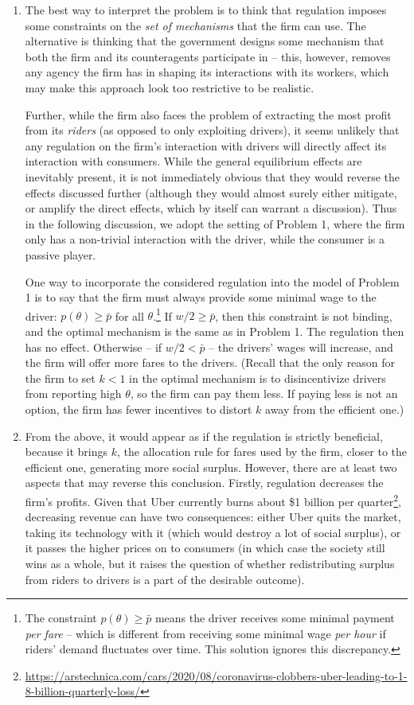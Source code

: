 \documentclass[a4paper]{article}
\begin{document}
	\begin{enumerate}
		\item The best way to interpret the problem is to think that regulation imposes some constraints on the \emph{set of mechanisms} that the firm can use. The alternative is thinking that the government designs some mechanism that both the firm and its counteragents participate in -- this, however, removes any agency the firm has in shaping its interactions with its workers, which may make this approach look too restrictive to be realistic.
		
		Further, while the firm also faces the problem of extracting the most profit from its \emph{riders} (as opposed to only exploiting drivers), it seems unlikely that any regulation on the firm's interaction with drivers will directly affect its interaction with consumers. While the general equilibrium effects are inevitably present, it is not immediately obvious that they would reverse the effects discussed further (although they would almost surely either mitigate, or amplify the direct effects, which by itself can warrant a discussion). Thus in the following discussion, we adopt the setting of Problem 1, where the firm only has a non-trivial interaction with the driver, while the consumer is a passive player.
		
		One way to incorporate the considered regulation into the model of Problem 1 is to say that the firm must always provide some minimal wage to the driver: $p(\theta) \geq \bar{p}$ for all $\theta$.\footnote{The constraint $p(\theta) \geq \bar{p}$ means the driver receives some minimal payment \emph{per fare} -- which is different from receiving some minimal wage \emph{per hour} if riders' demand fluctuates over time. This solution ignores this discrepancy.}
		If $w/2 \geq \bar{p}$, then this constraint is not binding, and the optimal mechanism is the same as in Problem 1. The regulation then has no effect. Otherwise -- if $w/2 < \bar{p}$ -- the drivers' wages will increase, and the firm will offer more fares to the drivers. (Recall that the only reason for the firm to set $k<1$ in the optimal mechanism is to disincentivize drivers from reporting high $\theta$, so the firm can pay them less. If paying less is not an option, the firm has fewer incentives to distort $k$ away from the efficient one.)
		
		\item From the above, it would appear as if the regulation is strictly beneficial, because it brings $k$, the allocation rule for fares used by the firm, closer to the efficient one, generating more social surplus. However, there are at least two aspects that may reverse this conclusion. Firstly, regulation decreases the firm's profits. Given that Uber currently burns about \$1 billion per quarter\footnote{\url{https://arstechnica.com/cars/2020/08/coronavirus-clobbers-uber-leading-to-1-8-billion-quarterly-loss/}}, decreasing revenue can have two consequences: either Uber quits the market, taking its technology with it (which would destroy a lot of social surplus), or it passes the higher prices on to consumers (in which case the society still wins as a whole, but it raises the question of whether redistributing surplus from riders to drivers is a part of the desirable outcome).
		

\end{enumerate}
\end{document}
